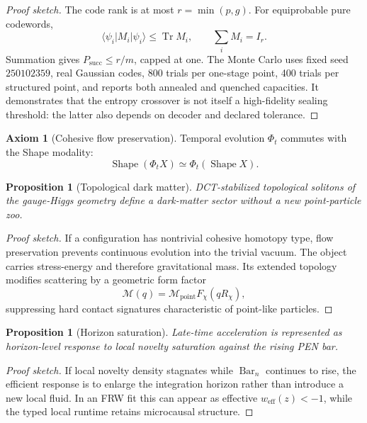 \documentclass[11pt]{article}
\theoremstyle{plain}
\newtheorem{proposition}[theorem]{Proposition}
\theoremstyle{definition}
\newtheorem{axiom}[theorem]{Axiom}
\theoremstyle{remark}
\newenvironment{proofsketch}{\begin{proof}[Proof sketch]}{\end{proof}}
\newcommand{\SelBar}{\operatorname{Bar}}
\newcommand{\Shape}{\operatorname{Shape}}
\newcommand{\Tr}{\operatorname{Tr}}
\begin{document}
\begin{proofsketch}
The code rank is at most \(r=\min(p,g)\). For equiprobable pure codewords,
\[
\langle\psi_i\rvert M_i\lvert\psi_i\rangle\le\Tr M_i,
\qquad
\sum_iM_i=I_r.
\]
Summation gives \(P_{\mathrm{succ}}\le r/m\), capped at one. The Monte Carlo uses fixed seed \(250102359\), real Gaussian codes, 800 trials per one-stage point, 400 trials per structured point, and reports both annealed and quenched capacities. It demonstrates that the entropy crossover is not itself a high-fidelity sealing threshold: the latter also depends on decoder and declared tolerance.
\end{proofsketch}

\begin{axiom}[Cohesive flow preservation]
Temporal evolution \(\Phi_t\) commutes with the Shape modality:
\[
\Shape(\Phi_t X)\simeq \Phi_t(\Shape X).
\]
\end{axiom}

\begin{proposition}[Topological dark matter]
DCT-stabilized topological solitons of the gauge-Higgs geometry define a dark-matter sector without a new point-particle zoo.
\end{proposition}

\begin{proofsketch}
If a configuration has nontrivial cohesive homotopy type, flow preservation prevents continuous evolution into the trivial vacuum. The object carries stress-energy and therefore gravitational mass. Its extended topology modifies scattering by a geometric form factor
\[
\mathcal{M}(q)=\mathcal{M}_{\mathrm{point}}F_\chi(qR_\chi),
\]
suppressing hard contact signatures characteristic of point-like particles.
\end{proofsketch}

\begin{proposition}[Horizon saturation]
Late-time acceleration is represented as horizon-level response to local novelty saturation against the rising PEN bar.
\end{proposition}

\begin{proofsketch}
If local novelty density stagnates while \(\SelBar_n\) continues to rise, the efficient response is to enlarge the integration horizon rather than introduce a new local fluid. In an FRW fit this can appear as effective \(w_{\mathrm{eff}}(z)<-1\), while the typed local runtime retains microcausal structure.
\end{proofsketch}
\end{document}
